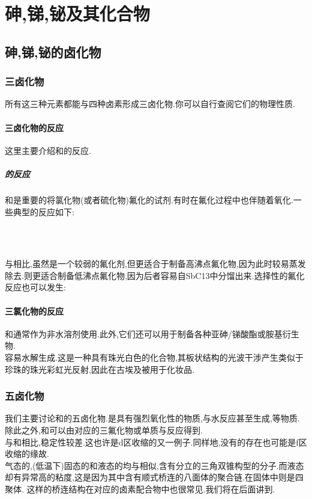 \documentclass{ctexart}
\begin{document}
\section{砷,锑,铋及其化合物}
\subsection{砷,锑,铋的卤化物}
\subsubsection{三卤化物}
所有这三种元素都能与四种卤素形成三卤化物.你可以自行查阅它们的物理性质.
\paragraph{三卤化物的反应}
这里主要介绍和的反应.
\subparagraph{的反应}
和是重要的将氯化物(或者硫化物)氟化的试剂.有时在氟化过程中也伴随着氧化.一些典型的反应如下:
\begin{center}
    \\
    \\
\end{center}
与相比,虽然是一个较弱的氟化剂,但更适合于制备高沸点氟化物,因为此时较易蒸发除去.则更适合制备低沸点氟化物,因为后者容易自{SbC13}中分馏出来.选择性的氟化反应也可以发生:
\begin{center}
\end{center}
\paragraph{三氯化物的反应}
和通常作为非水溶剂使用.此外,它们还可以用于制备各种亚砷/锑酸酯或胺基衍生物.\\
\indent {}容易水解生成.这是一种具有珠光白色的化合物,其板状结构的光波干涉产生类似于珍珠的珠光彩虹光反射,因此在古埃及被用于化妆品.
\subsubsection{五卤化物}
我们主要讨论和的五卤化物.是具有强烈氧化性的物质,与水反应甚至生成,等物质.\\
\indent 除此之外,和可以由对应的三氟化物或单质与反应得到.\\
\indent 与和相比,稳定性较差.这也许是d区收缩的又一例子.同样地,没有的存在也可能是f区收缩的缘故.\\
\indent 气态的,(低温下)固态的和液态的均与相似,含有分立的三角双锥构型的分子.而液态却有异常高的粘度,这是因为其中含有顺式桥连的八面体的聚合链.在固体中则是四聚体.
这样的桥连结构在对应的卤素配合物中也很常见.我们将在后面讲到.
\end{document}
